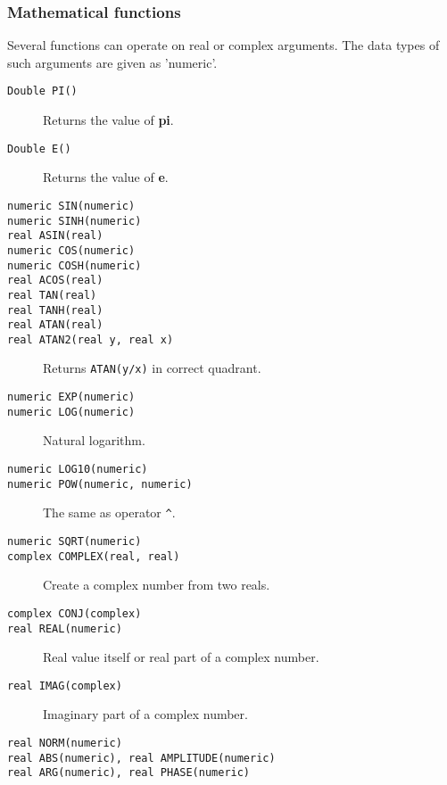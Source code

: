 \subsubsection{Mathematical functions}
Several functions can operate on real or complex arguments.
The data types of such arguments are given as 'numeric'.
\begin{description}
  \item[ \texttt{Double PI()}] Returns the value of \textbf{pi}.
  \item[ \texttt{Double E()}] Returns the value of \textbf{e}.
  \item[ \texttt{numeric SIN(numeric)}]
  \item[ \texttt{numeric SINH(numeric)}]
  \item[ \texttt{real ASIN(real)}]
  \item[ \texttt{numeric COS(numeric)}]
  \item[ \texttt{numeric COSH(numeric)}]
  \item[ \texttt{real ACOS(real)}]
  \item[ \texttt{real TAN(real)}]
  \item[ \texttt{real TANH(real)}]
  \item[ \texttt{real ATAN(real)}]
  \item[ \texttt{real ATAN2(real y, real x)}]
       Returns \texttt{ATAN(y/x)} in correct quadrant.
  \item[ \texttt{numeric EXP(numeric)}]
  \item[ \texttt{numeric LOG(numeric)}] Natural logarithm.
  \item[ \texttt{numeric LOG10(numeric)}]
  \item[ \texttt{numeric POW(numeric, numeric)}] The same as operator \verb+^+.
  \item[ \texttt{numeric SQRT(numeric)}]
  \item[ \texttt{complex COMPLEX(real, real)}]
       Create a complex number from two reals.
  \item[ \texttt{complex CONJ(complex)}]
  \item[ \texttt{real REAL(numeric)}] Real value itself or
    real part of a complex number.
  \item[ \texttt{real IMAG(complex)}] Imaginary part of a complex number.
  \item[ \texttt{real NORM(numeric)}]
  \item[ \texttt{real ABS(numeric),  real AMPLITUDE(numeric)}]
  \item[ \texttt{real ARG(numeric),  real PHASE(numeric)}]

\end{description}
